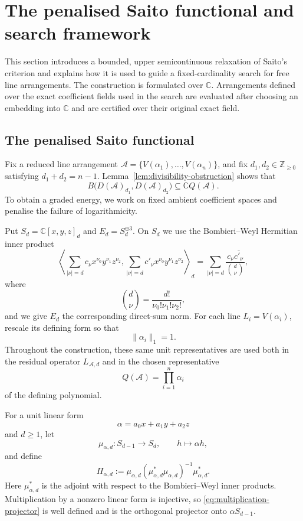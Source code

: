 \documentclass[pdflatex,sn-mathphys-num]{sn-jnl}%
\theoremstyle{remark}
\theoremstyle{definition}
\begin{document}
\section{The penalised Saito functional and search framework}
\label{sec:penalised-saito-functional}

This section introduces a bounded, upper semicontinuous relaxation of Saito's criterion and explains how it is used to guide a fixed-cardinality search for free line arrangements. The construction is formulated over $\mathbb{C}$. Arrangements defined over the exact coefficient fields used in the search are evaluated after choosing an embedding into $\mathbb{C}$ and are certified over their original exact field.

\subsection{The penalised Saito functional}
\label{subsec:saito-functional}
Fix a reduced line arrangement
$\mathcal{A}=\{V(\alpha_1),\ldots,V(\alpha_n)\}$, and fix
$d_1,d_2\in\mathbb Z_{\geq0}$ satisfying $d_1+d_2=n-1$.
Lemma~\ref{lem:divisibility-obstruction} shows that
\[
B\bigl(D(\mathcal{A})_{d_1},D(\mathcal{A})_{d_2}\bigr)
\subseteq
\mathbb C Q(\mathcal{A}).
\]
To obtain a graded energy, we work on fixed ambient coefficient spaces and
penalise the failure of logarithmicity.

Put $S_d=\mathbb C[x,y,z]_d$ and $E_d=S_d^{\oplus3}$. On $S_d$ we use the
Bombieri--Weyl Hermitian inner product
\begin{equation}
\label{eq:BW-inner-product}
\left\langle
\sum_{|\nu|=d}c_\nu x^{\nu_0}y^{\nu_1}z^{\nu_2},
\sum_{|\nu|=d}c'_\nu x^{\nu_0}y^{\nu_1}z^{\nu_2}
\right\rangle_d
=
\sum_{|\nu|=d}
\frac{c_\nu\overline{c'_\nu}}{\binom d\nu},
\end{equation}
where
\[
\binom d\nu
=
\frac{d!}{\nu_0!\nu_1!\nu_2!},
\]
and we give $E_d$ the corresponding direct-sum norm. For each line $L_i=V(\alpha_i)$, rescale its defining form so that
\[
\|\alpha_i\|_1=1.
\]
Throughout the construction, these same unit representatives are used both
in the residual operator $L_{\mathcal{A},d}$ and in the chosen representative
\[
Q(\mathcal{A})
=
\prod_{i=1}^n\alpha_i
\]
of the defining polynomial.

For a unit linear form
\[
\alpha=a_0x+a_1y+a_2z
\]
and $d\geq1$, let
\[
\mu_{\alpha,d}:S_{d-1}\longrightarrow S_d,
\qquad
h\longmapsto\alpha h,
\]
and define
\begin{equation}
\label{eq:multiplication-projector}
\Pi_{\alpha,d}
:=
\mu_{\alpha,d}
(\mu_{\alpha,d}^{*}\mu_{\alpha,d})^{-1}
\mu_{\alpha,d}^{*}.
\end{equation}
Here $\mu_{\alpha,d}^{*}$ is the adjoint with respect to the
Bombieri--Weyl inner products. Multiplication by a nonzero linear form is
injective, so \eqref{eq:multiplication-projector} is well defined and is the
orthogonal projector onto $\alpha S_{d-1}$.
\end{document}
